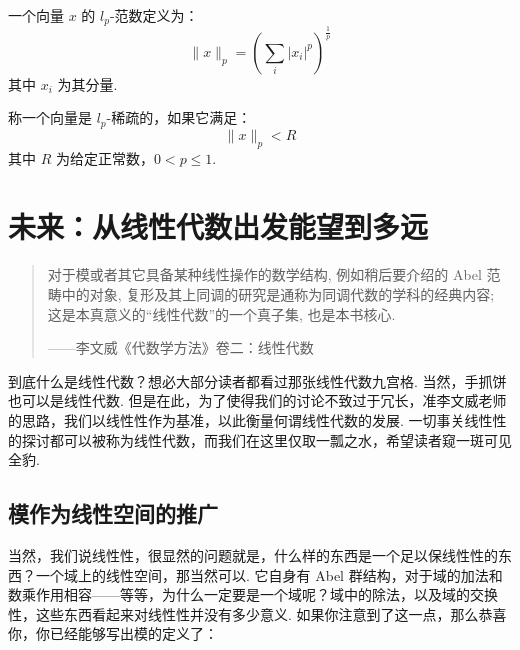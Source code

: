 \begin{definition}
    一个向量 $x$ 的 $l_p$-范数定义为：
    \[ \lVert x \rVert_p = \left( \sum_{i}|x_i|^p \right)^{\frac{1}{p}} \]
    其中 $x_i$ 为其分量.
\end{definition}

\begin{definition}
    称一个向量是 $l_p$-稀疏的，如果它满足：
    \[ \lVert x \rVert_p < R \]
    其中 $R$ 为给定正常数，$0 < p \leqslant 1$.
\end{definition}

\section{未来：从线性代数出发能望到多远}

\begin{quote}

    \kaishu
    对于模或者其它具备某种线性操作的数学结构, 例如稍后要介绍的 Abel 范畴中的对象, 复形及其上同调的研究是通称为同调代数的学科的经典内容; 这是本真意义的``线性代数''的一个真子集, 也是本书核心.

    \begin{flushright}
        \kaishu
        ——李文威《代数学方法》卷二：线性代数
    \end{flushright}

\end{quote}

到底什么是线性代数？想必大部分读者都看过那张线性代数九宫格. 当然，手抓饼也可以是线性代数. 但是在此，为了使得我们的讨论不致过于冗长，准李文威老师的思路，我们以线性性作为基准，以此衡量何谓线性代数的发展. 一切事关线性性的探讨都可以被称为线性代数，而我们在这里仅取一瓢之水，希望读者窥一斑可见全豹.

\subsection{模作为线性空间的推广}

当然，我们说线性性，很显然的问题就是，什么样的东西是一个足以保线性性的东西？一个域上的线性空间，那当然可以. 它自身有 Abel 群结构，对于域的加法和数乘作用相容——等等，为什么一定要是一个域呢？域中的除法，以及域的交换性，这些东西看起来对线性性并没有多少意义. 如果你注意到了这一点，那么恭喜你，你已经能够写出模的定义了：


